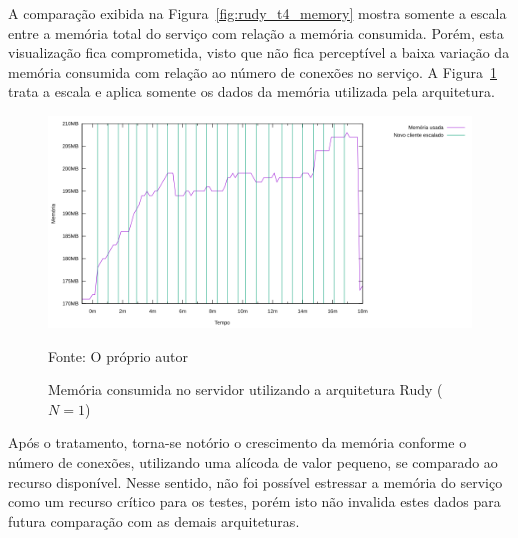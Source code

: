 A comparação exibida na Figura~\ref{fig:rudy_t4_memory} mostra somente a escala entre a memória total do serviço com relação a memória consumida.
%
Porém, esta visualização fica comprometida, visto que não fica perceptível a baixa variação da memória consumida com relação ao número de conexões no serviço.
%
A Figura~\ref{fig:rudy_t4_memory_used} trata a escala e aplica somente os dados da memória utilizada pela arquitetura.

\begin{figure}[htb!]
    \caption{Memória consumida no servidor utilizando a arquitetura Rudy ($N=1$)}
    \label{fig:rudy_t4_memory_used}
    \includegraphics[width=\textwidth]{metricas_rudy_t4/memory_used.png}
    \centering
    
    Fonte: O próprio autor
\end{figure}

Após o tratamento, torna-se notório o crescimento da memória conforme o número de conexões, utilizando uma alícoda de valor pequeno, se comparado ao recurso disponível.
%
Nesse sentido, não foi possível estressar a memória do serviço como um recurso crítico para os testes, porém isto não invalida estes dados para futura comparação com as demais arquiteturas.

